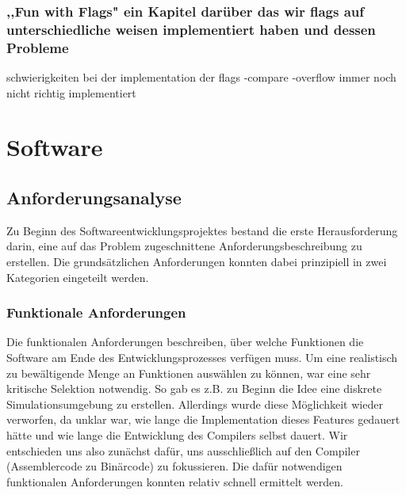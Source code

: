 \documentclass[paper=a4,fontsize=12pt,twocolumn]{scrreprt}
\begin{document}
\subsection{,,Fun with Flags" ein Kapitel darüber das wir flags auf unterschiedliche weisen implementiert haben und dessen Probleme}

schwierigkeiten bei der implementation der flags
-compare
-overflow immer noch nicht richtig implementiert

\chapter{Software}

\section{Anforderungsanalyse}
Zu Beginn des Softwareentwicklungsprojektes bestand die erste Herausforderung darin, eine auf das Problem zugeschnittene Anforderungsbeschreibung zu erstellen.
Die grundsätzlichen Anforderungen konnten dabei prinzipiell in zwei Kategorien eingeteilt werden.

\subsection{Funktionale Anforderungen}


Die funktionalen Anforderungen beschreiben, über welche Funktionen die Software am Ende des Entwicklungsprozesses verfügen muss.
Um eine realistisch zu bewältigende Menge an Funktionen auswählen zu können, war eine sehr kritische Selektion notwendig. 
So gab es z.B. zu Beginn die Idee eine diskrete Simulationsumgebung zu erstellen. Allerdings wurde diese Möglichkeit wieder verworfen, da unklar war, wie lange die Implementation dieses Features gedauert hätte und wie lange die Entwicklung des Compilers selbst dauert. 
Wir entschieden uns also zunächst dafür, uns ausschließlich auf den Compiler (Assemblercode zu Binärcode) zu fokussieren.
Die dafür notwendigen funktionalen Anforderungen konnten relativ schnell ermittelt werden.
\end{document}
